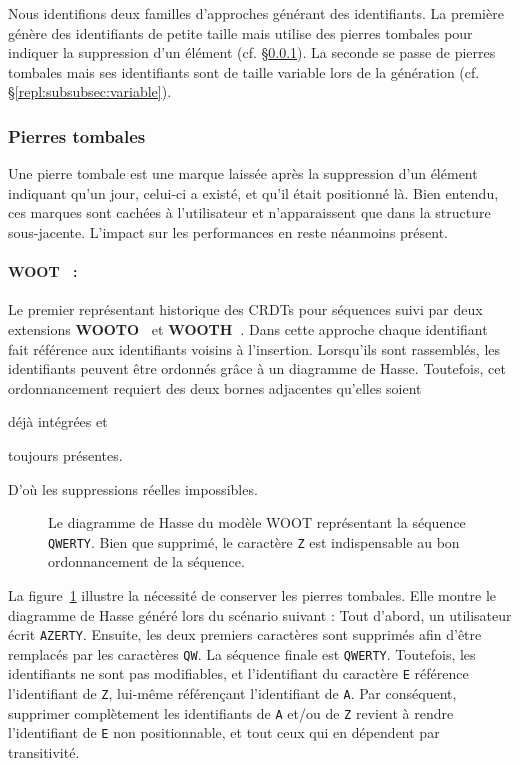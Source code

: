 Nous identifions deux familles d'approches générant des identifiants. La
première génère des identifiants de petite taille mais utilise des pierres
tombales pour indiquer la suppression d'un élément
(cf. §\ref{repl:subsubsec:tombstone}). La seconde se passe de pierres tombales mais
ses identifiants sont de taille variable lors de la génération
(cf. §\ref{repl:subsubsec:variable}).

\subsubsection{Pierres tombales}
\label{repl:subsubsec:tombstone}

Une pierre tombale est une marque laissée après la suppression d'un élément
indiquant qu'un jour, celui-ci a existé, et qu'il était positionné là. Bien
entendu, ces marques sont cachées à l'utilisateur et n'apparaissent que dans la
structure sous-jacente. L'impact sur les performances en reste néanmoins
présent.

\paragraph{WOOT~\cite{oster2006data} :} Le premier représentant historique des
CRDTs pour séquences suivi par deux extensions
\textbf{WOOTO~\cite{weiss2007wooki}} et
\textbf{WOOTH~\cite{ahmed2011evaluating}}. Dans cette approche chaque
identifiant fait référence aux identifiants voisins à l'insertion.  Lorsqu'ils
sont rassemblés, les identifiants peuvent être ordonnés grâce à un diagramme de
Hasse. Toutefois, cet ordonnancement requiert des deux bornes adjacentes
qu'elles soient
\begin{inparaenum}[(i)]
\item déjà intégrées et
\item toujours présentes.
\end{inparaenum}
D'où les suppressions réelles impossibles.

\begin{figure}
  \centering
  
  \caption[Diagramme de Hasse dans WOOT]
  {\label{repl:fig:wootexample}Le diagramme de Hasse du modèle WOOT représentant
    la séquence \texttt{QWERTY}. Bien que supprimé, le caractère \texttt{Z} est
    indispensable au bon ordonnancement de la séquence.}
\end{figure}

\noindent La figure~\ref{repl:fig:wootexample} illustre la nécessité de
conserver les pierres tombales. Elle montre le diagramme de Hasse généré lors du
scénario suivant : Tout d'abord, un utilisateur écrit \texttt{AZERTY}. Ensuite,
les deux premiers caractères sont supprimés afin d'être remplacés par les
caractères \texttt{QW}. La séquence finale est \texttt{QWERTY}. Toutefois, les
identifiants ne sont pas modifiables, et l'identifiant du caractère \texttt{E}
référence l'identifiant de \texttt{Z}, lui-même référençant l'identifiant de
\texttt{A}. Par conséquent, supprimer complètement les identifiants de
\texttt{A} et/ou de \texttt{Z} revient à rendre l'identifiant de \texttt{E} non
positionnable, et tout ceux qui en dépendent par transitivité.

